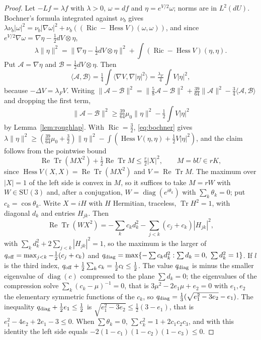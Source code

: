 \documentclass[aps,prd,twocolumn,superscriptaddress,nofootinbib,longbibliography,floatfix,amsmath,amssymb,10pt]{revtex4-2}
\theoremstyle{definition}
\theoremstyle{remark}
\newcommand{\SU}{\mathrm{SU}}
\newcommand{\Tr}{\operatorname{Tr}}
\newcommand{\ReTr}{\operatorname{Re}\operatorname{Tr}}
\newcommand{\Hess}{\operatorname{Hess}}
\newcommand{\Ric}{\operatorname{Ric}}
\newcommand{\ip}[2]{\langle #1,#2\rangle}
\begin{document}
\begin{proof}
Let $-Lf=\lambda f$ with $\lambda>0$, $\omega=df$ and $\eta=e^{V/2}\omega$;
norms are in $L^2(dU)$. Bochner's formula integrated against $\nu_b$ gives
$\lambda\nu_b|\omega|^2=\nu_b|\nabla\omega|^2+\nu_b((\Ric-\Hess V)(\omega,
\omega))$, and since $e^{V/2}\nabla\omega=\nabla\eta-\frac12dV\otimes\eta$,
\begin{equation}\label{eq:bochner}
\lambda\|\eta\|^2=\|\nabla\eta-\tfrac12dV\otimes\eta\|^2+\int(\Ric-\Hess V)
(\eta,\eta).
\end{equation}
Put $\mathcal A=\nabla\eta$ and $\mathcal B=\frac12dV\otimes\eta$. Then
\[
\ip{\mathcal A}{\mathcal B}=\tfrac14\int\ip{\nabla V}{\nabla|\eta|^2}
=\tfrac{\lambda_F}4\int V|\eta|^2 ,
\]
because $-\Delta V=\lambda_FV$. Writing $\|\mathcal A-\mathcal B\|^2=
\|\frac58\mathcal A-\mathcal B\|^2+\frac{39}{64}\|\mathcal A\|^2-\frac34
\ip{\mathcal A}{\mathcal B}$ and dropping the first term,
\[
\|\mathcal A-\mathcal B\|^2\ge\tfrac{39}{64}\mu_0\|\eta\|^2-\tfrac12\int
V|\eta|^2
\]
by Lemma~\ref{lem:roughlap}. With $\Ric=\frac32$, \eqref{eq:bochner} gives
$\lambda\|\eta\|^2\ge(\frac{39}{64}\mu_0+\frac32)\|\eta\|^2-\int(\Hess V(\eta,
\eta)+\frac12V|\eta|^2)$, and the claim follows from the pointwise bound
\begin{equation}\label{eq:pointwise}
\ReTr(MX^2)+\tfrac12\ReTr M\le\tfrac r2|X|^2,\qquad M=bU\in rK ,
\end{equation}
since $\Hess V(X,X)=\ReTr(MX^2)$ and $V=\ReTr M$. The maximum over $|X|=1$ of
the left side is convex in $M$, so it suffices to take $M=rW$ with $W\in
\SU(3)$ and, after a conjugation, $W=\operatorname{diag}(e^{i\theta_k})$ with
$\sum_k\theta_k=0$; put $c_k=\cos\theta_k$. Write $X=iH$ with $H$ Hermitian,
traceless, $\Tr H^2=1$, with diagonal $d_k$ and entries $H_{jk}$. Then
\[
\ReTr(WX^2)=-\sum_kc_kd_k^2-\sum_{j<k}(c_j+c_k)|H_{jk}|^2 ,
\]
with $\sum_kd_k^2+2\sum_{j<k}|H_{jk}|^2=1$, so the maximum is the larger of
$q_{\rm off}=\max_{j<k}-\frac12(c_j+c_k)$ and $q_{\rm diag}=\max\{-\sum c_kd_k^2:
\sum d_k=0,\ \sum d_k^2=1\}$. If $l$ is the third index, $q_{\rm off}+\frac12
\sum_kc_k=\frac12c_l\le\frac12$. The value $q_{\rm diag}$ is minus the smaller
eigenvalue of $\operatorname{diag}(c)$ compressed to the plane $\sum d_k=0$;
the eigenvalues of the compression solve $\sum_k(c_k-\mu)^{-1}=0$, that is
$3\mu^2-2e_1\mu+e_2=0$ with $e_1,e_2$ the elementary symmetric functions of
the $c_k$, so $q_{\rm diag}=\frac13(\sqrt{e_1^2-3e_2}-e_1)$. The inequality
$q_{\rm diag}+\frac12e_1\le\frac12$ is $\sqrt{e_1^2-3e_2}\le\frac12(3-e_1)$, that
is $e_1^2-4e_2+2e_1-3\le0$. When $\sum\theta_k=0$, $\sum c_k^2=1+2c_1c_2c_3$,
and with this identity the left side equals $-2(1-c_1)(1-c_2)(1-c_3)\le0$.
\end{proof}
\end{document}
